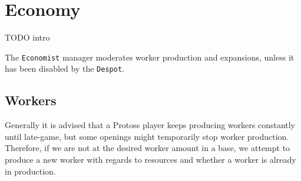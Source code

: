 \section{Economy}
TODO intro

The \texttt{Economist} manager moderates worker production and expansions, unless it has been disabled by the \texttt{Despot}.

	\subsection*{Workers}
	Generally it is advised that a Protoss player keeps producing workers constantly until late-game, but some openings might temporarily stop worker production. Therefore, if we are not at the desired worker amount in a base, we attempt to produce a new worker with regards to resources and whether a worker is already in production.

	
	
	
